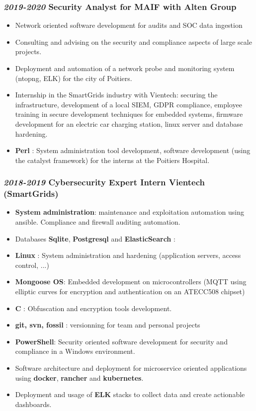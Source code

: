 \documentclass[a4paper, oneside, final]{scrartcl} %
\begin{document}
\begin{center}
\subsubsection*{ \textit{\textbf{2019-2020}} Security Analyst for MAIF with Alten Group}
\begin{itemize}
\item Network oriented software development for audits and SOC data ingestion
\item Consulting and advising on the security and compliance aspects of large scale projects.
\item Deployment and automation of a network probe and monitoring system (ntopng, ELK) for the city of Poitiers.
\item Internship in the SmartGrids industry with Vientech: securing the infrastructure, development of a local SIEM, GDPR compliance, employee training in secure development
techniques for embedded systems, firmware development for an electric car charging station, linux server and database hardening.
\item  \textbf{Perl} : System administration tool development, software development (using the catalyst framework) for the interns at the Poitiers Hospital.
\end{itemize}

\subsubsection*{\textit{\textbf{2018-2019}} Cybersecurity Expert Intern Vientech (SmartGrids)}
\begin{itemize}%
\item \textbf{System administration}: maintenance and exploitation automation using ansible. Compliance and firewall auditing automation.
\item Databases \textbf{Sqlite}, \textbf{Postgresql} and \textbf{ElasticSearch} :
\item  \textbf{Linux} : System administration and hardening (application servers, access control, ...)
\item\textbf{Mongoose OS}: Embedded development on microcontrollers (MQTT using elliptic curves for encryption and authentication on an ATECC508 chipset)
\item \textbf{C} : Obfuscation and encryption tools development.
\item \textbf{git, svn, fossil} : versionning for team and personal projects
\item \textbf{PowerShell}: Security oriented software development for security and compliance in a Windows environment.
\item Software architecture and deployment for microservice oriented applications using
    \textbf{docker},
    \textbf{rancher} and \textbf{kubernetes}.
\item Deployment and usage of \textbf{ELK} stacks to collect data and create actionable dashboards.
\end{itemize}

\end{center}
\end{document}
